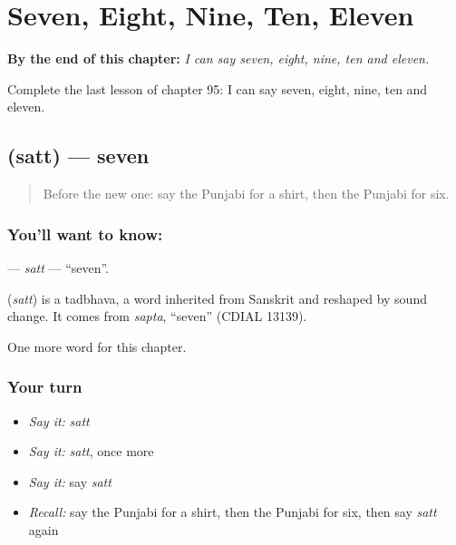 
\chapter{Seven, Eight, Nine, Ten, Eleven}
\label{ch:pa-seven-eight-nine-ten-eleven}

\begin{chapteropening}
\textbf{By the end of this chapter:} \emph{I can say seven, eight, nine, ten and eleven.}

Complete the last lesson of chapter 95: I can say seven, eight, nine, ten and eleven.
\end{chapteropening}

\section[\texorpdfstring{\pa{ਸੱਤ} (satt)}{ਸੱਤ (satt)}]{ (satt) — seven}

\label{lesson:PA-C95-satt}



\begin{quote}
Before the new one: say the Punjabi for a shirt, then the Punjabi for six.
\end{quote}

\subsection*{You'll want to know: }
\textbf{} — \emph{satt} — \textquotedblleft{}seven\textquotedblright{}.

\begin{cousinweb}
\textbf{} (\emph{satt}) is a tadbhava, a word inherited from Sanskrit and reshaped by sound change. It comes from \emph{sapta}, \textquotedblleft{}seven\textquotedblright{} (CDIAL 13139).
\end{cousinweb}

\begin{grammarlens}[title={What you've built}]
One more word for this chapter.
\end{grammarlens}

\subsection*{Your turn}
\begin{itemize}
\raggedright
  \item \emph{Say it:} \emph{satt}
  \item \emph{Say it:} \emph{satt}, once more
  \item \emph{Say it:} say \emph{satt}
  \item \emph{Recall:} say the Punjabi for a shirt, then the Punjabi for six, then say \emph{satt} again
\end{itemize}

